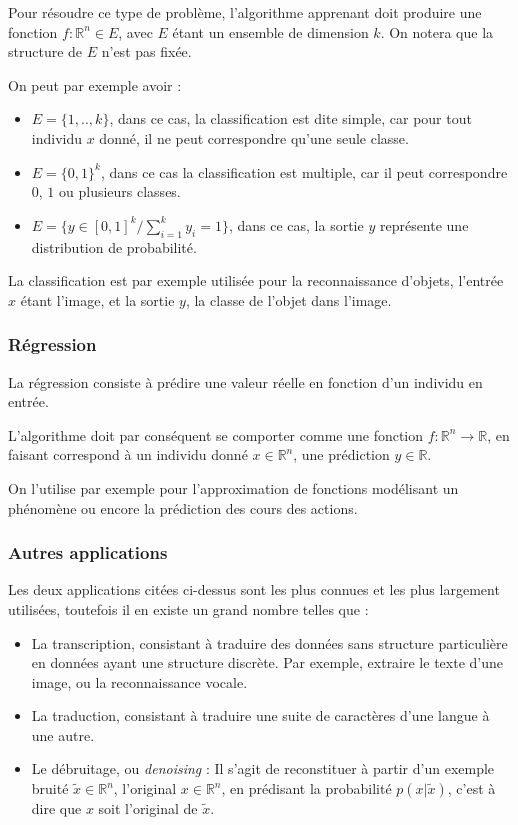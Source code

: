 \documentclass[a4paper, 10pt]{report}
\begin{document}
Pour résoudre ce type de problème, l'algorithme apprenant doit produire une fonction $f : \mathbb{R}^n \in E$, avec $E$ étant un ensemble de dimension $k$.
On notera que la structure de $E$ n'est pas fixée.

On peut par exemple avoir :
\begin{itemize}
	\item $E = \{1,..,k\}$, dans ce cas, la classification est dite simple, car pour tout individu $x$ donné, il ne peut correspondre qu'une seule classe.
	\item $E = \{0,1\}^k$, dans ce cas la classification est multiple, car il peut correspondre $0$, $1$ ou plusieurs classes.
	\item $E = \{y \in [0,1]^k/ \sum_{i=1}^{k}{y_i}=1  \}$, dans ce cas, la sortie $y$ représente une distribution de probabilité.
\end{itemize}
La classification est par exemple utilisée pour la reconnaissance d'objets, l'entrée $x$ étant l'image, et la sortie $y$, la classe de l'objet dans l'image.
\subsubsection{Régression}
La régression consiste à prédire une valeur réelle en fonction d'un individu en entrée.

L'algorithme doit par conséquent se comporter comme une fonction $f : \mathbb{R}^n \rightarrow \mathbb{R}$, en faisant correspond à un individu donné $x \in \mathbb{R}^n$, une prédiction $y \in \mathbb{R}$.

On l'utilise par exemple pour l'approximation de fonctions modélisant un phénomène ou encore la prédiction des cours des actions.
\subsubsection{Autres applications}
Les deux applications citées ci-dessus sont les plus connues et les plus largement utilisées, toutefois il en existe un grand nombre telles que :
\begin{itemize}
	\item La transcription, consistant à traduire des données sans structure particulière en données ayant une structure discrète. Par exemple, extraire le texte d'une image, ou la reconnaissance vocale.
	\item La traduction, consistant à traduire une suite de caractères d'une langue à une autre.
	\item Le débruitage, ou \emph{denoising} : Il s'agit de reconstituer à partir d'un exemple bruité $\tilde{x} \in \mathbb{R}^n$, l'original $x \in \mathbb{R}^n$, en prédisant la probabilité $p(x|\tilde{x})$, c'est à dire que $x$ soit l'original de $\tilde{x}$.
\end{itemize}
		
\end{document}
